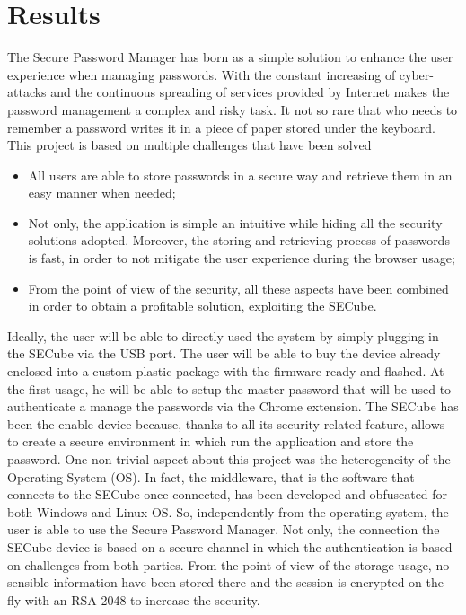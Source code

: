 \chapter{Results}
\label{sec:results}

The Secure Password Manager has born as a simple solution to enhance the user experience when managing passwords. With the constant increasing of cyber-attacks and the continuous spreading of services provided by Internet makes the password management a complex and risky task. It not so rare that who needs to remember a password writes it in a piece of paper stored under the keyboard.\newline\newline
This project is based on multiple challenges that have been solved
\begin{itemize}
	\item All users are able to store passwords in a secure way and retrieve them in an easy manner when needed;
	\item Not only, the application is simple an intuitive while hiding all the security solutions adopted. Moreover, the storing and retrieving process of passwords is fast, in order to not mitigate the user experience during the browser usage;
	\item From the point of view of the security, all these aspects have been combined in order to obtain a profitable solution, exploiting the SECube.
\end{itemize}

Ideally, the user will be able to directly used the system by simply plugging in the SECube via the USB port. The user will be able to buy the device already enclosed into a custom plastic package with the firmware ready and flashed. At the first usage, he will be able to setup the master password that will be used to authenticate a manage the passwords via the Chrome extension. The SECube has been the enable device because, thanks to all its security related feature, allows to create a secure environment in which run the application and store the password.\newline\newline
One non-trivial aspect about this project was the heterogeneity of the Operating System (OS). In fact, the middleware, that is the software that connects to the SECube once connected, has been developed and obfuscated for both Windows and Linux OS. So, independently from the operating system, the user is able to use the Secure Password Manager. Not only, the connection the SECube device is based on a secure channel in which the authentication is based on challenges from both parties. From the point of view of the storage usage, no sensible information have been stored there and the session is encrypted on the fly with an RSA 2048 to increase the security. 


